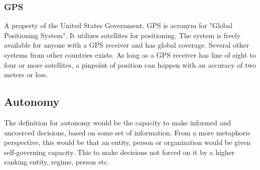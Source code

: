 \documentclass[conference]{IEEEtran}
\begin{document}
	 \subsubsection{GPS}
		 A property of the United States Government. GPS is acronym for "Global Positioning System".
		 It utilizes satellites for positioning. The system is freely available for anyone with a GPS
		 receiver and has global coverage. Several other systems from other countries exists.
		 As long as a GPS receiver has line of sight to four or more satellites, a pinpoint of
		 position can happen with an accuracy of two meters or less.

 \subsection{Autonomy}
	 The definition for autonomy would be the capacity to make informed and uncoerced decisions,
	 based on some set of information. From a more metaphoric perspective, this would be that
	 an entity, person or organization would be given self-governing capacity. This to make
	 decisions not forced on it by a higher ranking entity, regime, person etc.
	 
\end{document}
